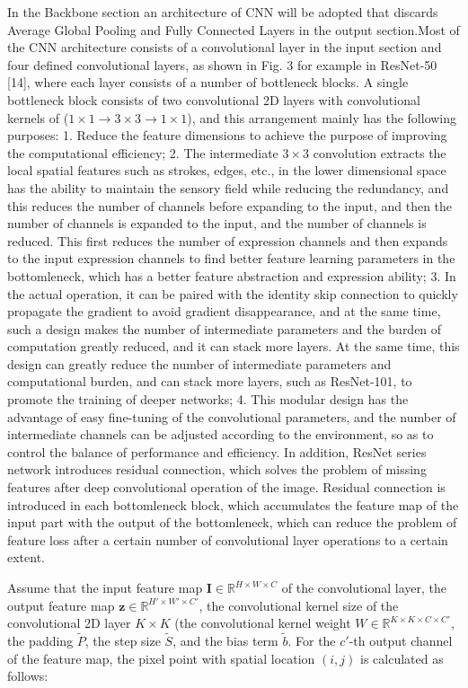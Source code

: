 In the Backbone section an architecture of CNN will be adopted that discards Average Global Pooling and Fully Connected Layers in the output section.Most of the CNN architecture consists of a convolutional layer in the input section and four defined convolutional layers, as shown in Fig. 3 for example in ResNet-50 [14], where each layer consists of a number of bottleneck blocks. A single bottleneck block consists of two convolutional 2D layers with convolutional kernels of ($1\times 1 \to 3\times 3 \to 1\times 1$), and this arrangement mainly has the following purposes: 1. Reduce the feature dimensions to achieve the purpose of improving the computational efficiency; 2. The intermediate $3\times 3$ convolution extracts the local spatial features such as strokes, edges, etc., in the lower dimensional space has the ability to maintain the sensory field while reducing the redundancy, and this reduces the number of channels before expanding to the input, and then the number of channels is expanded to the input, and the number of channels is reduced. This first reduces the number of expression channels and then expands to the input expression channels to find better feature learning parameters in the bottomleneck, which has a better feature abstraction and expression ability; 3. In the actual operation, it can be paired with the identity skip connection to quickly propagate the gradient to avoid gradient disappearance, and at the same time, such a design makes the number of intermediate parameters and the burden of computation greatly reduced, and it can stack more layers. At the same time, this design can greatly reduce the number of intermediate parameters and computational burden, and can stack more layers, such as ResNet-101, to promote the training of deeper networks; 4. This modular design has the advantage of easy fine-tuning of the convolutional parameters, and the number of intermediate channels can be adjusted according to the environment, so as to control the balance of performance and efficiency. In addition, ResNet series network introduces residual connection, which solves the problem of missing features after deep convolutional operation of the image. Residual connection is introduced in each bottomleneck block, which accumulates the feature map of the input part with the output of the bottomleneck, which can reduce the problem of feature loss after a certain number of convolutional layer operations to a certain extent.

Assume that the input feature map $ \mathbf{I} \in \mathbb{ R }^{ H\times W\times C } $ of the convolutional layer, the output feature map $\boldsymbol{z} \in \mathbb{ R }^{ H'\times W'\times C' }$, the convolutional kernel size of the convolutional 2D layer $K\times K$ (the convolutional kernel weight $ W \in \mathbb{ R }^{ K\times K\times C\times C' } $, the padding $\tilde{P}$, the step size $\tilde{S}$, and the bias term $\tilde{b}$. For the $c'$-th output channel of the feature map, the pixel point with spatial location $(i,j)$ is calculated as follows: 

